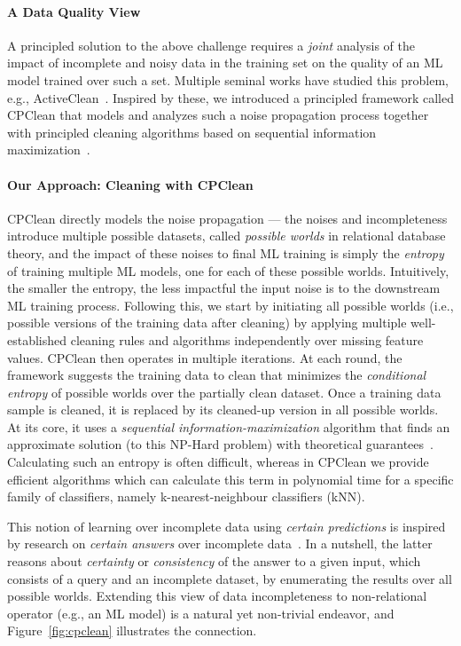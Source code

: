 \documentclass[11pt]{article}
\begin{document}
 \vspace{-0.5em}
\paragraph*{A Data Quality View}
A principled solution to the above 
challenge requires a \textit{joint}
analysis of the impact of incomplete and noisy data in the training
set on the quality of an ML model trained over
such a set. Multiple seminal works have studied this problem, e.g., ActiveClean~\cite{krishnan2016activeclean}.
Inspired by these, we introduced 
a principled framework called CPClean that models
and analyzes such a 
noise propagation process together with principled cleaning algorithms based on 
sequential information maximization~\cite{karlavs2020nearest}.

\paragraph{Our Approach: Cleaning with CPClean}
CPClean directly models the noise propagation ---
the noises and incompleteness introduce
multiple possible datasets, called \emph{possible worlds} in relational database theory,
and the impact of these noises to 
final ML training is simply the \textit{entropy} 
of training multiple ML models, one for each of these possible worlds. Intuitively,
the smaller the entropy, the less impactful
the input noise is to the downstream 
ML training process.
Following this, we start by initiating all possible worlds (i.e., possible versions of the training data after cleaning) by applying multiple well-established cleaning rules and algorithms independently over missing feature values.
CPClean then operates in multiple iterations. At each round, the framework suggests the training data to clean that minimizes the \textit{conditional entropy} of possible worlds over the partially clean dataset. Once a training data sample is cleaned, it is replaced by its cleaned-up version in all possible worlds. At its core, it uses a \emph{sequential information-maximization} algorithm that finds an approximate solution (to this NP-Hard problem) with theoretical guarantees~\cite{karlavs2020nearest}.
Calculating such an entropy is often difficult,
whereas in CPClean we provide efficient algorithms which can calculate this term in polynomial time for a specific family of 
classifiers, namely k-nearest-neighbour
classifiers (kNN).

This notion of learning over incomplete data using \emph{certain predictions} is inspired by research on \emph{certain answers} over incomplete data~\cite{abiteboul1995foundations, suciu2011probabilistic, arenas1999consistent}. In a nutshell, the latter reasons about \emph{certainty} or \emph{consistency} of the answer to a given input, which consists of a query and an incomplete dataset, by enumerating the results over all possible worlds. Extending this view of data incompleteness to non-relational operator (e.g., an ML model) is a natural yet non-trivial endeavor, and Figure~\ref{fig:cpclean} illustrates the connection.
\end{document}

